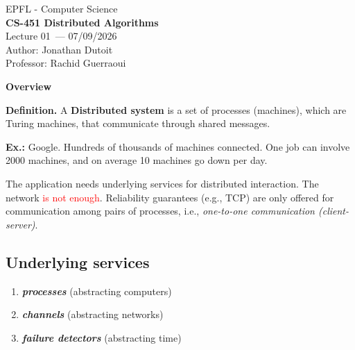 \documentclass[11pt]{article}
\newcommand{\coursename}{CS-451 Distributed Algorithms}
\newcommand{\lecturenum}{01}
\newcommand{\lecturedate}{07/09/2026}
\newcommand{\professor}{Rachid Guerraoui}
\begin{document}
\begin{center}
  {\large EPFL - Computer Science} \\[0.5em]
  {\Large \textbf{\coursename}} \\[0.5em]
  {\large Lecture \lecturenum\ --- \lecturedate} \\[0.5em]
  {\large Author: Jonathan Dutoit} \\[0.5em]
  {\large Professor: \professor} \\[0.5em]
\end{center}

\vspace{2cm}

\begin{center}
	{\LARGE \textbf{Overview}}
\end{center}
\vspace{0.5cm}

\begin{tcolorbox}[
    enhanced,
    frame hidden,
    borderline west={2pt}{0pt}{black},
    boxsep=5pt,
    left=8pt
]
\textbf{Definition.} A \textbf{Distributed system} is a set of processes (machines), which are Turing machines, that communicate through shared messages.  

\end{tcolorbox}
\textbf{Ex.:} Google. Hundreds of thousands of machines connected. One job can involve 2000 machines, and on average 10 machines go down per day. 

The application needs underlying services for distributed interaction. The network \textcolor{red}{is not enough}. Reliability guarantees (e.g., TCP) are only offered for communication among pairs of processes, i.e., \textit{one-to-one communication (client-server)}.

\subsection*{Underlying services}
\begin{enumerate}
	\item \textbf{\textit{processes}} (abstracting computers)
	\item \textbf{\textit{channels}} (abstracting networks)
	\item \textbf{\textit{failure detectors}} (abstracting time)
\end{enumerate}
\end{document}
